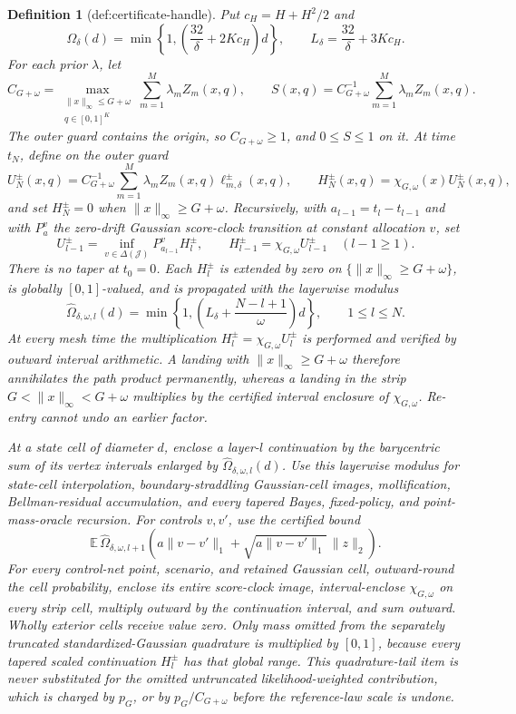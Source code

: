\documentclass{article}
\newtheorem{definition}{Definition}
\begin{document}
\begin{definition}[def:certificate-handle]
Put \(c_H=H+H^2/2\) and
\[
 \Omega_\delta(d)=\min\!\left\{1,\left(\frac{32}{\delta}+2Kc_H\right)d\right\},
 \qquad
 L_\delta=\frac{32}{\delta}+3Kc_H.
\]
For each prior \(\lambda\), let
\[
 C_{G+\omega}=\max_{\substack{\|x\|_\infty\leq G+\omega\\q\in[0,1]^K}}
 \sum_{m=1}^M\lambda_mZ_m(x,q),
 \qquad
 S(x,q)=C_{G+\omega}^{-1}\sum_{m=1}^M\lambda_mZ_m(x,q).
\]
The outer guard contains the origin, so \(C_{G+\omega}\geq1\), and \(0\leq S\leq1\) on it.  At time \(t_N\), define on the outer guard
\[
 U_N^\pm(x,q)=C_{G+\omega}^{-1}\sum_{m=1}^M
 \lambda_mZ_m(x,q)\ell_{m,\delta}^{\pm}(x,q),
 \qquad H_N^\pm(x,q)=\chi_{G,\omega}(x)U_N^\pm(x,q),
\]
and set \(H_N^\pm=0\) when \(\|x\|_\infty\geq G+\omega\).  Recursively, with \(a_{l-1}=t_l-t_{l-1}\) and with \(P_a^v\) the zero-drift Gaussian score-clock transition at constant allocation \(v\), set
\[
 U_{l-1}^\pm=\inf_{v\in\Delta(\mathcal J)}P_{a_{l-1}}^vH_l^\pm,
 \qquad
 H_{l-1}^\pm=\chi_{G,\omega}U_{l-1}^\pm\quad(l-1\geq1).
\]
There is no taper at \(t_0=0\).  Each \(H_l^\pm\) is extended by zero on \(\{\|x\|_\infty\geq G+\omega\}\), is globally \([0,1]\)-valued, and is propagated with the layerwise modulus
\[
 \widehat\Omega_{\delta,\omega,l}(d)
 =\min\!\left\{1,\left(L_\delta+\frac{N-l+1}{\omega}\right)d\right\},
 \qquad 1\leq l\leq N.
\]
At every mesh time the multiplication \(H_l^\pm=\chi_{G,\omega}U_l^\pm\) is performed and verified by outward interval arithmetic.  A landing with \(\|x\|_\infty\geq G+\omega\) therefore annihilates the path product permanently, whereas a landing in the strip \(G<\|x\|_\infty<G+\omega\) multiplies by the certified interval enclosure of \(\chi_{G,\omega}\).  Re-entry cannot undo an earlier factor.

At a state cell of diameter \(d\), enclose a layer-\(l\) continuation by the barycentric sum of its vertex intervals enlarged by \(\widehat\Omega_{\delta,\omega,l}(d)\).  Use this layerwise modulus for state-cell interpolation, boundary-straddling Gaussian-cell images, mollification, Bellman-residual accumulation, and every tapered Bayes, fixed-policy, and point-mass-oracle recursion.  For controls \(v,v'\), use the certified bound
\[
 \mathbb E\,\widehat\Omega_{\delta,\omega,l+1}\!\left(
 a\|v-v'\|_1+\sqrt{a\|v-v'\|_1}\,\|z\|_2\right).
\]
For every control-net point, scenario, and retained Gaussian cell, outward-round the cell probability, enclose its entire score-clock image, interval-enclose \(\chi_{G,\omega}\) on every strip cell, multiply outward by the continuation interval, and sum outward.  Wholly exterior cells receive value zero.  Only mass omitted from the separately truncated standardized-Gaussian quadrature is multiplied by \([0,1]\), because every tapered scaled continuation \(H_l^\pm\) has that global range.  This quadrature-tail item is never substituted for the omitted untruncated likelihood-weighted contribution, which is charged by \(p_G\), or by \(p_G/C_{G+\omega}\) before the reference-law scale is undone.


\end{definition}
\end{document}
